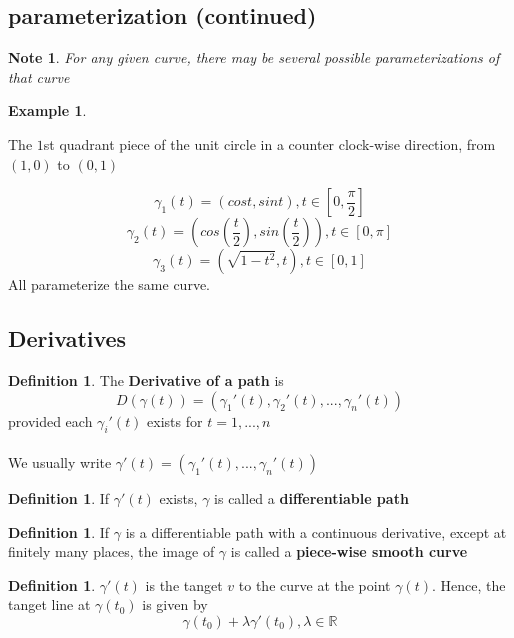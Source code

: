 \documentclass[12pt]{article}
\theoremstyle{plain}
\newtheorem*{note}{Note}
\theoremstyle{definition}
\newtheorem{definition}[theorem]{Definition}
\newtheorem{example}[theorem]{Example}
\begin{document}
\subsection{parameterization (continued)}

\begin{note}
	For any given curve, there may be several possible parameterizations of that curve
\end{note}

\begin{example}
	
\end{example} The $1$st quadrant piece of the unit circle in a counter clock-wise direction, from $(1,0)$ to $(0,1)$

$$\gamma_1 (t) = (cost, sint), t\in [0, \frac{\pi}{2}]$$
$$\gamma_2 (t) = (cos(\frac{t}{2}), sin(\frac{t}{2})), t\in [0, \pi]$$
$$\gamma_3 (t) = (\sqrt{1-t^2}, t), t\in [0, 1]$$
All parameterize the same curve.

\subsection{Derivatives}

\begin{definition}
	The \textbf{Derivative of a path} is
	$$D(\gamma(t)) = (\gamma_1'(t), \gamma_2'(t), ... , \gamma_n'(t))$$
	provided each $\gamma_i'(t)$ exists for $t=1,...,n$\\
	\\
	We usually write $\gamma' (t) = (\gamma_1'(t),...,\gamma_n'(t))$ 
\end{definition}

\begin{definition}
	If $\gamma'(t)$ exists, $\gamma$ is called a \textbf{differentiable path}
\end{definition}

\begin{definition}
	If $\gamma$ is a differentiable path with a continuous derivative, except at finitely many places, the image of $\gamma$ is called a \textbf{piece-wise smooth curve}
\end{definition}

\begin{definition}
	$\gamma'(t)$ is the tanget $v$ to the curve at the point $\gamma (t)$. Hence, the tanget line at $\gamma (t_0)$ is given by
	$$\gamma (t_0) + \lambda \gamma ' (t_0), \lambda \in \mathbb{R}$$
\end{definition}
\end{document}

